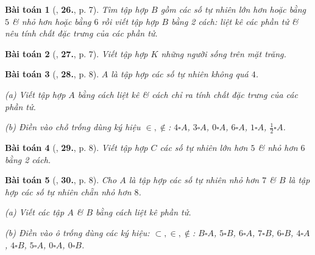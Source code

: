 \documentclass{article}
\numberwithin{equation}{section}
\newtheorem{baitoan}{Bài toán}[section]
\begin{document}
\begin{baitoan}[\cite{Trong_Toan_6_2021}, \textbf{26.}, p. 7]
	Tìm tập hợp $B$ gồm các số tự nhiên lớn hơn hoặc bằng $5$ \& nhỏ hơn hoặc bằng $6$ rồi viết tập hợp $B$ bằng 2 cách: liệt kê các phần tử \& nêu tính chất đặc trưng của các phần tử.
\end{baitoan}

\begin{baitoan}[\cite{Trong_Toan_6_2021}, \textbf{27.}, p. 7]
	Viết tập hợp $K$ những người sống trên mặt trăng.
\end{baitoan}

\begin{baitoan}[\cite{Trong_Toan_6_2021}, \textbf{28.}, p. 8]
	$A$ là tập hợp các số tự nhiên không quá $4$.
	\begin{enumerate*}
		\item[(a)] Viết tập hợp $A$ bằng cách liệt kê \& cách chỉ ra tính chất đặc trưng của các phần tử.
		\item[(b)] Điền vào chỗ trống dùng ký hiệu $\in,\notin$: $4\square A$, $3\square A$, $0\square A$, $6\square A$, $1\square A$, $\frac{1}{2}\square A$.
	\end{enumerate*}
\end{baitoan}

\begin{baitoan}[\cite{Trong_Toan_6_2021}, \textbf{29.}, p. 8]
	Viết tập hợp $C$ các số tự nhiên lớn hơn $5$ \& nhỏ hơn $6$ bằng 2 cách.
\end{baitoan}

\begin{baitoan}[\cite{Trong_Toan_6_2021}, \textbf{30.}, p. 8]
	Cho $A$ là tập hợp các số tự nhiên nhỏ hơn $7$ \& $B$ là tập hợp các số tự nhiên chẵn nhỏ hơn $8$.
	\begin{enumerate*}
		\item[(a)] Viết các tập $A$ \& $B$ bằng cách liệt kê phần tử.
		\item[(b)] Điền vào ô trống dùng các ký hiệu: $\subset,\in,\notin$: $B\square A$, $5\square B$, $6\square A$, $7\square B$, $6\square B$, $4\square A$, $4\square B$, $5\square A$, $0\square A$, $0\square B$.
	\end{enumerate*}
\end{baitoan}
\end{document}
